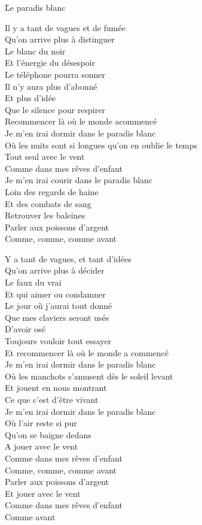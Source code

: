 \documentclass{novel}
\begin{document}
\newpage
\normalsize
\h*{Le paradis blanc}
\begin{multicols}{2}
Il y a tant de vagues et de fumée \\
Qu'on arrive plus à distinguer \\
Le blanc du noir \\
Et l'énergie du désespoir \\
Le téléphone pourra sonner \\
Il n'y aura plus d'abonné \\
Et plus d'idée \\
Que le silence pour respirer \\
Recommencer là où le monde acommencé \\

Je m'en irai dormir dans le paradis blanc \\
Où les nuits sont si longues qu'on en oublie le temps \\
Tout seul avec le vent \\
Comme dans mes rêves d'enfant \\
Je m'en irai courir dans le paradis blanc \\
Loin des regards de haine \\
Et des combats de sang \\
Retrouver les baleines \\
Parler aux poissons d'argent \\
Comme, comme, comme avant \\
\columnbreak

Y a tant de vagues, et tant d'idées \\
Qu'on arrive plus à décider \\
Le faux du vrai \\
Et qui aimer ou condamner \\
Le jour où j'aurai tout donné \\
Que mes claviers seront usés \\
D'avoir osé \\
Toujours vouloir tout essayer \\
Et recommencer là où le monde a commencé \\

Je m'en irai dormir dans le paradis blanc \\
Où les manchots s'amusent dès le soleil levant \\
Et jouent en nous montrant \\
Ce que c'est d'être vivant \\
Je m'en irai dormir dans le paradis blanc \\
Où l'air reste si pur \\
Qu'on se baigne dedans \\
A jouer avec le vent \\
Comme dans mes rêves d'enfant \\
Comme, comme, comme avant \\

Parler aux poissons d'argent \\
Et jouer avec le vent \\
Comme dans mes rêves d'enfant \\
Comme avant

\end{multicols}
\end{document}
